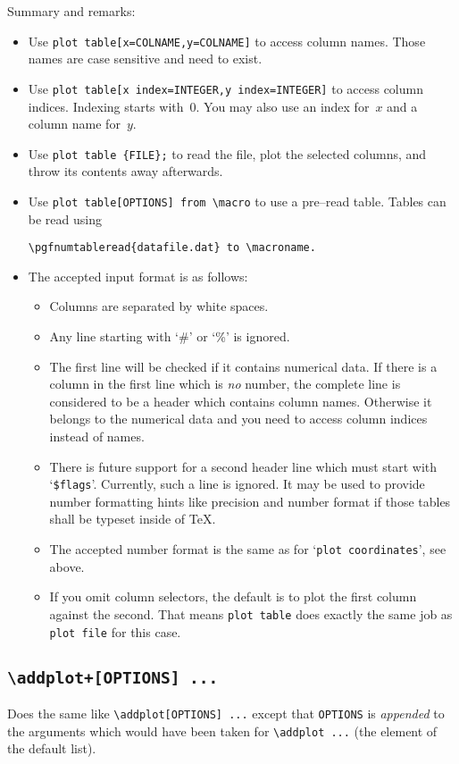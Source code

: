 Summary and remarks:
\begin{itemize}
	\item Use \texttt{plot table[x=COLNAME,y=COLNAME]} to access column names. Those names are case sensitive and need to exist.
	\item Use \texttt{plot table[x index=INTEGER,y index=INTEGER]} to access column indices. Indexing starts with~$0$. You may also use an index for~$x$ and a column name for~$y$.
	\item Use \lstinline!plot table {FILE};! to read the file, plot the selected columns, and throw its contents away afterwards.
	\item Use \lstinline!plot table[OPTIONS] from \macro! to use a pre--read table. Tables can be read using
\begin{lstlisting}
\pgfnumtableread{datafile.dat} to \macroname.
\end{lstlisting}
	\item The accepted input format is as follows:
		\begin{itemize}
			\item Columns are separated by white spaces.
			\item Any line starting with `\#' or `\%' is ignored.
			\item The first line will be checked if it contains numerical data. If there is a column in the first line which is \emph{no} number, the complete line is considered to be a header which contains column names. Otherwise it belongs to the numerical data and you need to access column indices instead of names.

			\item There is future support for a second header line which must start with `\texttt{\$flags}'. Currently, such a line is ignored. It may be used to provide number formatting hints like precision and number format if those tables shall be typeset inside of \TeX.
			\item The accepted number format is the same as for `\texttt{plot coordinates}', see above.
			\item If you omit column selectors, the default is to plot the first column against the second. That means \texttt{plot table} does exactly the same job as \texttt{plot file} for this case.
		\end{itemize}
\end{itemize}

\subsection{\texttt{\textbackslash addplot+[OPTIONS] ...}}
Does the same like \lstinline!\addplot[OPTIONS] ...! except that \texttt{OPTIONS} is \emph{appended} to the arguments which would have been taken for \lstinline!\addplot ...! (the element of the default list).

